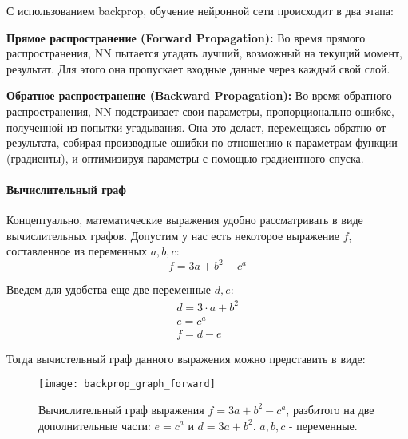 С использованием backprop, обучение нейронной сети происходит в два этапа:

\textbf{Прямое распространение (Forward Propagation):} 
Во время прямого распространения, NN пытается
угадать лучший, возможный на текущий момент, результат. 
Для этого она пропускает входные данные через 
каждый свой слой.

\textbf{Обратное распространение (Backward Propagation):} 
Во время обратного распространения, NN
подстраивает свои параметры, пропорционально ошибке, полученной из попытки
угадывания. Она это делает, перемещаясь обратно от результата, собирая
производные ошибки по отношению к параметрам функции (градиенты), и
оптимизируя параметры с помощью градиентного спуска.

\paragraph{Вычислительный граф}

Концептуально, математические выражения удобно рассматривать в виде 
вычислительных графов. Допустим у нас есть некоторое выражение $f$, 
составленное из переменных $a, b, c$:
\begin{equation*}
    f = 3a + b^2 - c^a
\end{equation*}

Введем для удобства еще две переменные $d, e$:
\begin{gather*}
    d = 3 \cdot a + b^2 \\
    e = c^a \\
    f = d - e
\end{gather*}

Тогда вычистельный граф данного выражения можно представить в виде:
\begin{figure}[h!]
    \centering
    \texttt{[image: backprop\_graph\_forward]}
    \caption{Вычислительный граф выражения $f = 3a + b^2 - c^a$, разбитого на две 
    дополнительные части: $e = c^a$ и $d = 3a + b^2$. $a, b, c$ - переменные.}
    \label{fig:backprop_graph_forward}
\end{figure}


